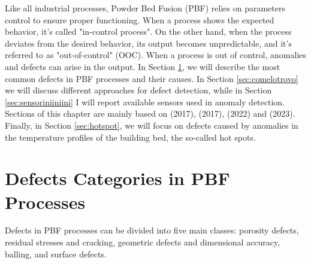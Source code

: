 Like all industrial processes, Powder Bed Fusion (PBF) relies on parameters control to ensure proper functioning. When a process shows the expected behavior, it's called "in-control process". On the other hand, when the process deviates from the desired behavior, its output becomes unpredictable, and it's referred to as "out-of-control" (OOC). When a process is out of control, anomalies and defects can arise in the output. In Section \ref{sec:defects}, we will describe the most common defects in PBF processes and their causes. In Section \ref{sec:comelotrovo} we will discuss different approaches for defect detection, while in Section \ref{sec:sensoriniiniini} I will report available sensors used in anomaly detection.  Sections of this chapter are mainly based on \citeauthor{grasso_-process_2017} (2017), \citeauthor{grasso_process_2017} (2017), \citeauthor{mostafaei_defects_2022} (2022) and \citeauthor{wu_additively_2023} (2023). Finally, in Section \ref{sec:hotspot}, we will focus on defects caused by anomalies in the temperature profiles of the building bed, the so-called hot spots.

\section{Defects Categories in PBF Processes}
\label{sec:defects}
Defects in PBF processes can be divided into five main classes: porosity defects, residual stresses and cracking, geometric defects and dimensional accuracy, balling, and surface defects.
